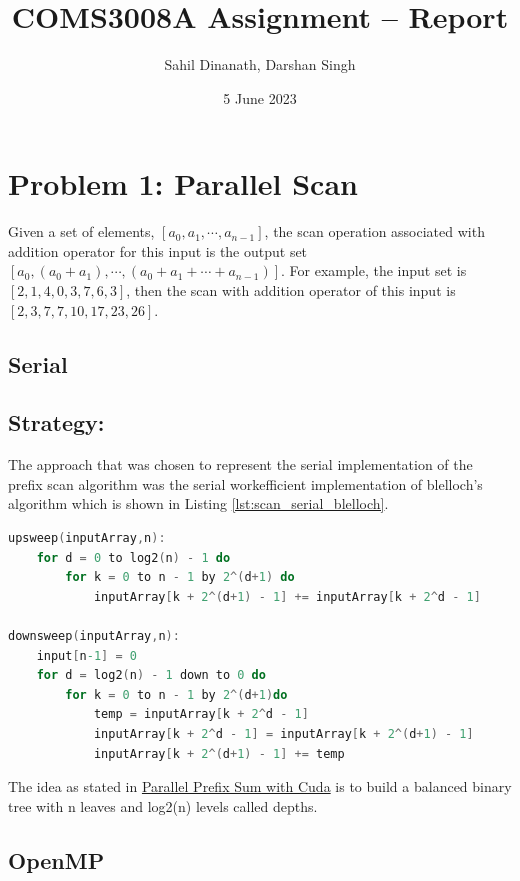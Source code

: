 
\title{COMS3008A Assignment -- Report}
\author{Sahil Dinanath, Darshan Singh}
\date{5 June 2023} 
\maketitle 
\pagestyle{fancy}
\fancyhf{}
\fancyhead[R]{\thepage}
{} 
\section{Problem 1: Parallel Scan}
	 Given a set of elements, $[a_0,a_1,\dotsm,a_{n-1}]$, the scan operation associated with addition operator for this input is the output set $[a_0,(a_0+a_1),\dotsm,(a_0+a_1+\dotsm+a_{n-1})]$. 
	 For example, the input set is $[2,1,4,0,3,7,6,3]$, then the scan with addition operator of this input is $[2,3,7,7,10,17,23,26]$. 
\subsection{Serial} 
\subsection*{Strategy:}
The approach that was chosen to represent the serial implementation of the prefix scan algorithm was the serial workefficient implementation of blelloch's algorithm which is shown in Listing \ref{lst:scan_serial_blelloch}. 
\begin{lstlisting}[language=C, caption={upsweep and downsweep pseudocode}, label={lst:scan_serial_blelloch}]
upsweep(inputArray,n):
	for d = 0 to log2(n) - 1 do
    	for k = 0 to n - 1 by 2^(d+1) do
        	inputArray[k + 2^(d+1) - 1] += inputArray[k + 2^d - 1]

downsweep(inputArray,n):
	input[n-1] = 0
	for d = log2(n) - 1 down to 0 do 
		for k = 0 to n - 1 by 2^(d+1)do 
			temp = inputArray[k + 2^d - 1] 
			inputArray[k + 2^d - 1] = inputArray[k + 2^(d+1) - 1]
			inputArray[k + 2^(d+1) - 1] += temp
\end{lstlisting}
The idea as stated in \href{https://developer.nvidia.com/gpugems/gpugems3/part-vi-gpu-computing/chapter-39-parallel-prefix-sum-scan-cuda}{Parallel Prefix Sum with Cuda} is to build a balanced binary tree with n leaves and log2(n) levels called depths.
\subsection{OpenMP}
